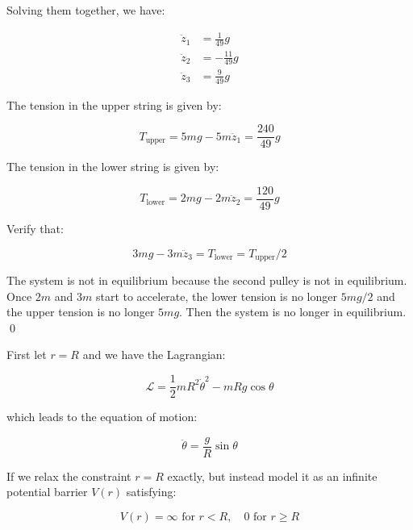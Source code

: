 \documentclass[12pt]{article}
\begin{document}
Solving them together, we have:

\begin{equation}
\begin{split}
    \ddot{z}_{1} &= \frac{1}{49} g \\
    \ddot{z}_{2} &= -\frac{11}{49} g \\
    \ddot{z}_{3} &= \frac{9}{49} g
\end{split}
\end{equation}

The tension in the upper string is given by:

\begin{equation}
    T_{\text{upper}} = 5mg - 5m \ddot{z}_{1} = \frac{240}{49} g
\end{equation}

The tension in the lower string is given by:

\begin{equation}
    T_{\text{lower}} = 2mg - 2m \ddot{z}_{2} = \frac{120}{49} g
\end{equation}

Verify that:

\begin{equation}
    3mg - 3m \ddot{z}_{3} = T_{\text{lower}} = T_{\text{upper}}/2
\end{equation}

The system is not in equilibrium because the second pulley is not in equilibrium. Once $2m$ and $3m$ start to accelerate, the lower tension is no longer $5mg/2$ and the upper tension is no longer $5mg$. Then the system is no longer in equilibrium.
\qed



First let $r = R$ and we have the Lagrangian:

\begin{equation}
    \mathcal{L} = \frac{1}{2} m R^{2} \dot{\theta}^{2} - mRg \cos{\theta}
\end{equation}

which leads to the equation of motion:

\begin{equation}
    \ddot{\theta} = \frac{g}{R} \sin{\theta}
\end{equation}

If we relax the constraint $r = R$ exactly, but instead model it as an infinite potential barrier $V(r)$ satisfying:

\begin{equation}
    V(r) = \infty \text{ for } r < R, \quad 0 \text{ for } r \ge R
\end{equation}
\end{document}
